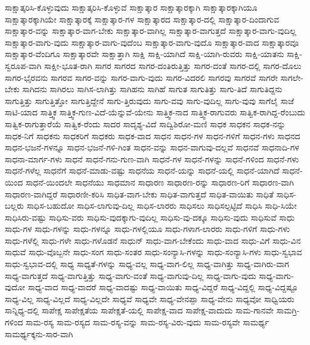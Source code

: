 {ಸಾಕ್ಷಾತ್ಕರಿಸಿ-ಕೊಳ್ಳುವುದು
ಸಾಕ್ಷಾತ್ಕರಿಸಿ-ಕೊಳ್ಳುವೆ
ಸಾಕ್ಷಾತ್ಕಾರ
ಸಾಕ್ಷಾತ್ಕಾರಕ್ಕಾಗಿ
ಸಾಕ್ಷಾತ್ಕಾರಕ್ಕಾಗಿಯೂ
ಸಾಕ್ಷಾತ್ಕಾರಕ್ಕಾಗಿಯೇ
ಸಾಕ್ಷಾತ್ಕಾರಕ್ಕೆ
ಸಾಕ್ಷಾತ್ಕಾರ-ಗಳ
ಸಾಕ್ಷಾತ್ಕಾರದ
ಸಾಕ್ಷಾತ್ಕಾರ-ದಲ್ಲಿ
ಸಾಕ್ಷಾತ್ಕಾರ-ದಿಂದಾಗುವ
ಸಾಕ್ಷಾತ್ಕಾರ-ವನ್ನು
ಸಾಕ್ಷಾತ್ಕಾರ-ವಾಗ-ಬೇಕು
ಸಾಕ್ಷಾತ್ಕಾರ-ವಾಗಿಲ್ಲ
ಸಾಕ್ಷಾತ್ಕಾರ-ವಾಗುತ್ತದೆ
ಸಾಕ್ಷಾತ್ಕಾರ-ವಾಗು-ವುದಿಲ್ಲ
ಸಾಕ್ಷಾತ್ಕಾರ-ವಾಗು-ವುದು
ಸಾಕ್ಷಾತ್ಕಾರ-ವಾಗು-ವುದೆಂಬ
ಸಾಕ್ಷಾತ್ಕಾರ-ವಾಗು-ವುದೊ
ಸಾಕ್ಷಾತ್ಕಾರ-ವಾದ
ಸಾಕ್ಷಾತ್ಕಾರವೂ
ಸಾಕ್ಷಾತ್ಕಾರ-ವೆಂದಿಗೂ
ಸಾಕ್ಷಾತ್ಕಾರವೇ
ಸಾಕ್ಷಾತ್ತಾಗಿ
ಸಾಕ್ಷಿ
ಸಾಕ್ಷಿ-ಯಾಗಿದೆ
ಸಾಕ್ಷಿ-ಯಾಗಿ-ರುವರು
ಸಾಕ್ಷಿ-ಯಾತನು
ಸಾಕ್ಷಿ-ಸ್ವರೂಪ-ವಾಗಿ
ಸಾಕ್ಷೀ-ಭೂತ-ರಾಗಿ
ಸಾಗರ
ಸಾಗರದ
ಸಾಗರ-ದಂತಿರುತ್ತಿತ್ತು
ಸಾಗರ-ದಂತೆ
ಸಾಗರ-ದಲ್ಲಿ
ಸಾಗರ-ದೊಲು
ಸಾಗರ-ಭೈರವನು
ಸಾಗರವ
ಸಾಗರ-ವನ್ನು
ಸಾಗರ-ವಾಗು-ವುದು
ಸಾಗರ-ವಿದರಲಿ
ಸಾಗರವು
ಸಾಗರವೆ
ಸಾಗರೇ
ಸಾಗಲೇ-ಬೇಕು
ಸಾಗಿದನು
ಸಾಗಿರಲು
ಸಾಗಿಸ-ಲಾಗಿತ್ತು
ಸಾಗಿಹನು
ಸಾಗಿಹೆ
ಸಾಗುತ
ಸಾಗುತಿತ್ತು
ಸಾಗು-ತಿದೆ
ಸಾಗುತಿದ್ದನು
ಸಾಗುತ್ತಿತ್ತು
ಸಾಗುತ್ತಿತ್ತೋ
ಸಾಗುತ್ತಿದ್ದೇನೆ
ಸಾಗು-ತ್ತಿರುವುದು
ಸಾಗು-ವವು
ಸಾಗು-ವುದಿಲ್ಲ
ಸಾಗು-ವುವು
ಸಾಗೆಲೈ
ಸಾಜೆ
ಸಾಟಿ-ಯಾದ
ಸಾತ್ತ್ವಿಕ
ಸಾತ್ತ್ವಿಕ-ಗುಣ-ವಿದೆ-ಯೆನ್ನುವೆ-ಯೇನು
ಸಾತ್ತ್ವಿಕ-ನಾದ
ಸಾತ್ತ್ವಿಕ-ರಾಗುವರು
ಸಾತ್ವಿಕ-ರಾಗಿದ್ದ-ರೆಂಬುದು
ಸಾತ್ವಿಕ-ರಾಗುತ್ತಾರೆಯೆ
ಸಾತ್ವಿಕ-ರೆಂದು
ಸಾದರ
ಸಾದೃಶ್ಯ-ವಿದೆ
ಸಾದ್ವಿಶಿರೋ-ಮಣಿ
ಸಾಧಕ
ಸಾಧಕನ
ಸಾಧಕ-ನನ್ನು
ಸಾಧಕ-ನಿಗೆ
ಸಾಧಕನು
ಸಾಧಕರಿಗೆ
ಸಾಧಕರು
ಸಾಧಕ-ವಾದ
ಸಾಧನ
ಸಾಧನ-ಗಳ
ಸಾಧನ-ಗಳಿಗೆ
ಸಾಧನ-ಗಳು
ಸಾಧನದ
ಸಾಧನ-ಭಜನೆ-ಗಳನ್ನೂ
ಸಾಧನ-ಭಜನೆ-ಗಳಿ-ಗಿಂತ
ಸಾಧನ-ವನ್ನು
ಸಾಧನ-ವಾಗುವು-ದಲ್ಲವೆ
ಸಾಧನವೆ
ಸಾಧನಾದಿ-ಗಳ
ಸಾಧನಾ-ಮಾರ್ಗ-ಗಳು
ಸಾಧನೆ
ಸಾಧನೆ-ಗನು-ಗುಣ-ವಾಗಿ
ಸಾಧನೆ-ಗಳ
ಸಾಧನೆ-ಗಳನ್ನು
ಸಾಧನೆ-ಗಳಿಂದ
ಸಾಧನೆ-ಗಳು
ಸಾಧನೆ-ಗಳೆಲ್ಲ
ಸಾಧನೆಗೆ
ಸಾಧನೆ-ಮಾಡು-ವಷ್ಟು
ಸಾಧನೆಯ
ಸಾಧನೆ-ಯನ್ನು
ಸಾಧನೆ-ಯಲ್ಲಿ
ಸಾಧನೆ-ಯಾಗಿದೆ
ಸಾಧನೆ-ಯಿಂದ
ಸಾಧನೆ-ಯಿಂದಲೇ
ಸಾಧನೆಯು
ಸಾಧಮಾನ
ಸಾಧಾರಣ
ಸಾಧಾರಣ-ರನ್ನು
ಸಾಧಾರಣ-ರಿಗೆ
ಸಾಧಾರಣ-ವಾಗಿ
ಸಾಧಾರಣ-ವಾಗಿದ್ದರೆ
ಸಾಧಾರಣೀ-ಕರಿಸಿ
ಸಾಧಿತ-ವಾಗ-ಬೇಕು
ಸಾಧಿತ-ವಾಗುತ್ತದೆ
ಸಾಧಿತ-ವಾಯಿತು
ಸಾಧಿತೆ
ಸಾಧಿಸ-ಬಲ್ಲರು
ಸಾಧಿಸ-ಬಹುದೋ
ಸಾಧಿಸ-ಲಾಗುವು-ದಿಲ್ಲ
ಸಾಧಿಸ-ಲಾರರು
ಸಾಧಿಸಲು
ಸಾಧಿಸಲ್ಪಟ್ಟಿದೆ
ಸಾಧಿಸಿ
ಸಾಧಿ-ಸಿಯೇ
ಸಾಧಿಸಿರು-ವಷ್ಟು
ಸಾಧಿಸು-ವರು
ಸಾಧಿಸು-ವುದಕ್ಕಾಗು-ವುದಿಲ್ಲ
ಸಾಧಿಸು-ವು-ದಕ್ಕೂ
ಸಾಧಿಸು-ವುದು
ಸಾಧಿಸುವೆ
ಸಾಧು
ಸಾಧು-ಗಳ
ಸಾಧು-ಗಳನ್ನು
ಸಾಧು-ಗಳನ್ನೂ
ಸಾಧು-ಗಳಲ್ಲಿಯೂ
ಸಾಧು-ಗಳಾಗ-ಲಾರರು
ಸಾಧು-ಗಳಿಗೆ
ಸಾಧು-ಗಳು
ಸಾಧು-ಗಳೆಲ್ಲಿ
ಸಾಧು-ಗಳೇ
ಸಾಧು-ಗಳೊಡನೆ
ಸಾಧುನ್
ಸಾಧು-ವಾಗ-ಬೇಕೆಂದು
ಸಾಧು-ವಾದ
ಸಾಧು-ವಿಗೆ
ಸಾಧು-ವಿನ
ಸಾಧುವೆ
ಸಾಧು-ವೊಬ್ಬನೇ
ಸಾಧು-ಸಂಗ
ಸಾಧು-ಸಂತರ
ಸಾಧು-ಸಂನ್ಯಾಸಿ-ಗಳನ್ನು
ಸಾಧು-ಸಂನ್ಯಾಸಿ-ಗಳು
ಸಾಧು-ಸ್ವಭಾವ
ಸಾಧು-ಸ್ವಭಾವ-ದಲ್ಲಿ
ಸಾಧ್ಯ
ಸಾಧ್ಯತೆ-ಗಳನ್ನು
ಸಾಧ್ಯ-ವಲ್ಲ
ಸಾಧ್ಯ-ವಾಗ-ಲಿಲ್ಲ
ಸಾಧ್ಯ-ವಾಗಿತ್ತು
ಸಾಧ್ಯ-ವಾಗಿರು-ವಾಗ
ಸಾಧ್ಯ-ವಾಗುತ್ತದೆ
ಸಾಧ್ಯ-ವಾಗುತ್ತಿತ್ತು
ಸಾಧ್ಯ-ವಾಗು-ವಂತೆ
ಸಾಧ್ಯ-ವಾಗುವು-ದಿಲ್ಲ
ಸಾಧ್ಯ-ವಾಗು-ವುದು
ಸಾಧ್ಯ-ವಾಗು-ವುದೋ
ಸಾಧ್ಯ-ವಾದ
ಸಾಧ್ಯ-ವಾದರೆ
ಸಾಧ್ಯ-ವಾದಷ್ಟು
ಸಾಧ್ಯ-ವಾಯಿತು
ಸಾಧ್ಯ-ವಿದ್ದರೆ
ಸಾಧ್ಯ-ವಿದ್ದಲ್ಲಿ
ಸಾಧ್ಯ-ವಿದ್ದಷ್ಟೂ
ಸಾಧ್ಯ-ವಿಲ್ಲ
ಸಾಧ್ಯ-ವಿಲ್ಲದೆ
ಸಾಧ್ಯ-ವಿಲ್ಲದೇ
ಸಾಧ್ಯವೆ
ಸಾಧ್ಯವೇ
ಸಾಧ್ಯ-ವೇನಪ್ಪಾ
ಸಾಧ್ಯ-ವೇನು
ಸಾಧ್ಯವೋ
ಸಾಧ್ವಿಯರು
ಸಾನ್ನಿಧ್ಯ-ದಲ್ಲಿ
ಸಾಪೇಕ್ಷ
ಸಾಪೇಕ್ಷತೆಯ
ಸಾಪೇಕ್ಷತೆ-ಯಲ್ಲಿ
ಸಾಪೇಕ್ಷ-ವಾದ
ಸಾಪೇಕ್ಷ-ವಾದುದು
ಸಾಮ-ಗಾನವೇ
ಸಾಮಗ್ರಿ-ಗಳಿಂದ
ಸಾಮ-ರಸ್ಯ
ಸಾಮ-ರಸ್ಯದ
ಸಾಮ-ರಸ್ಯ-ವನ್ನು
ಸಾಮ-ರಸ್ಯ-ವಿರು-ವುದು
ಸಾಮ-ರಸ್ಯವೇ
ಸಾಮರ್ಥ್ಯ
ಸಾಮರ್ಥ್ಯಕ್ಕನು-ಸಾರ-ವಾಗಿ
}
